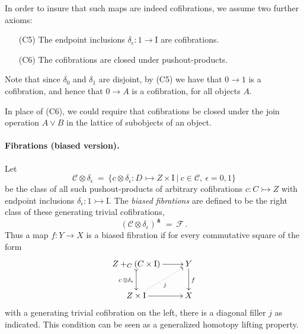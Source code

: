 \documentclass[12pt]{article}
\newcommand{\mono}{\ensuremath{\rightarrowtail}}
\newcommand{\ra}{\ensuremath{\rightarrow}}
\newcommand{\I}{\ensuremath{\mathrm{I}}}
\newtheorem{proposition}[theorem]{Proposition}
\theoremstyle{remark}
\theoremstyle{definition}
\begin{document}
In order to insure that such maps are indeed cofibrations, we assume  two further axioms:
\begin{enumerate}
\item[(C5)] The endpoint inclusions $\delta_\epsilon : 1 \ra \I$ are cofibrations.
\item[(C6)] The cofibrations are closed under pushout-products.  
\end{enumerate}

Note that since $\delta_0$ and $\delta_1$ are disjoint, by (C5) we have that $0 \ra 1$ is a cofibration, and hence that $0\ra A$ is a cofibration, for all objects $A$.

In place of (C6), we could require that cofibrations be closed under the join operation $A\vee B$ in the lattice of subobjects of an object.
\medskip

\paragraph{Fibrations (biased version).}
Let 
\[
\mathcal{C}\otimes \delta_\epsilon\ =\ \{ c \otimes \delta_\epsilon : D \mono Z \times \I\ |\ c \in\mathcal{C},\ \epsilon = 0,1 \}
\]
be the class of all such pushout-products of arbitrary cofibrations $c : C \mono Z$ with endpoint inclusions $\delta_\epsilon : 1 \mono \I$.
The \emph{biased fibrations} are defined to be the right class of these generating trivial cofibrations,
\[
(\mathcal{C}\otimes \delta_\epsilon)^\pitchfork\ =\ \mathcal{F}\,.
\]
Thus a map $f : Y\ra X$ is a biased fibration if for every commutative square of the form
\begin{equation}\label{diagram:biasedfillers}
\xymatrix{
Z +_C (C\times\I) \ar@{>->}[d]_{c\, \otimes \delta_\epsilon} \ar[r] & Y \ar[d]^f \\
Z\times \I \ar@{.>}[ru]_{j} \ar[r] & X
}
\end{equation}
with a generating trivial cofibration on the left, there is a diagonal filler $j$ as indicated. This condition can be seen as a generalized homotopy lifting property.
\end{document}
